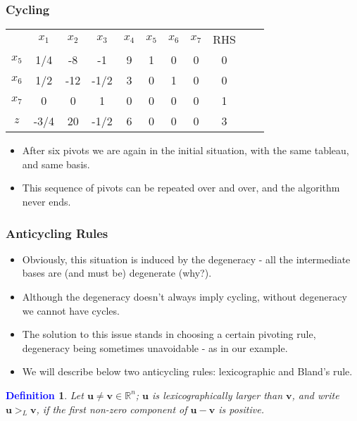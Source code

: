 \documentclass{beamer}
\theoremstyle{plain}
\newcommand{\git}[1]{\textcolor{grena}{\it #1}}
\newtheorem{deff}{\bf \textcolor{blue}{Definition}}[subsection]
\def\R{{\mathbb R}}
\def\v{{\mathbf v}}
\def\uu{{\mathbf u}}
\begin{document}
\begin{frame}\frametitle{Cycling}
\justifying

\begin{center}
\vspace{-0.3cm}
\begin{tabular}{c|ccccccc|ccc}	
& $x_1 $ & $ x_2 $ & $ x_3 $ & $ x_4 $ & $ x_5 $ & $ x_6 $ & $ x_7 $ &{\tiny RHS}  & & \\
\cline{1-9}	
 $ x_5 $ & 1/4 & -8 & -1 & 9 & 1 & 0 & 0 & 0 & & \\	
 $ x_6 $ & 1/2 & -12 & -1/2 & 3 & 0  & 1 & 0 & 0 & & \\	
$ x_7 $ & 0 & 0 & 1 & 0 & 0 & 0 & 0 & 1 &  &   \\
\cline{1-9}	
$ z $ & -3/4 & 20 & -1/2 & 6 & 0 & 0 & 0 & 3 & \\
\end{tabular}
\end{center}

\begin{itemize}
\justifying

\item After six pivots we are again in the initial situation, with the same tableau, and same basis.

\item This sequence of pivots can be repeated over and over, and the algorithm never ends.

\end{itemize}

\end{frame}

\begin{frame}\frametitle{Anticycling Rules}
\justifying

\begin{itemize}
\justifying

\item Obviously, this situation is induced by the degeneracy - all the intermediate bases are (and must be) degenerate (why?).

\item Although the degeneracy doesn't always imply cycling, without degeneracy we cannot have cycles.

\item The solution to this issue stands in choosing a certain pivoting rule, degeneracy being sometimes unavoidable - as in our example.

\item We will describe below two anticycling rules: lexicographic and Bland's rule.

\end{itemize}

\begin{mdframed}[style=myf]
\begin{deff}
\justifying
Let $ \uu \ne \v \in \R^n $; $ \uu $ is \git{lexicographically larger} than $ \v $, and write $ \uu >_L \v $, if the first non-zero component of $ \uu - \v $ is positive.
\end{deff}
\end{mdframed}

\end{frame}
\end{document}

